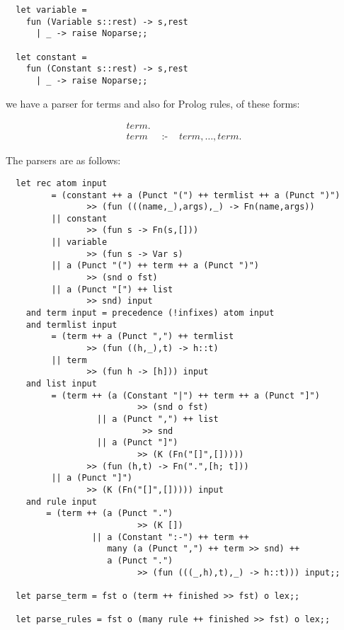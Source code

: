 \begin{boxed}\begin{verbatim}
  let variable =
    fun (Variable s::rest) -> s,rest
      | _ -> raise Noparse;;

  let constant =
    fun (Constant s::rest) -> s,rest
      | _ -> raise Noparse;;
\end{verbatim}\end{boxed}

\noindent we have a parser for terms and also for Prolog rules, of these forms:

\begin{eqnarray*}
term\mbox{.}    & &                                             \\
term            & \mbox{ :- } & term,\ldots,term\mbox{.}
\end{eqnarray*}

\noindent The parsers are as follows:

\begin{boxed}\begin{verbatim}
  let rec atom input
         = (constant ++ a (Punct "(") ++ termlist ++ a (Punct ")")
                >> (fun (((name,_),args),_) -> Fn(name,args))
         || constant
                >> (fun s -> Fn(s,[]))
         || variable
                >> (fun s -> Var s)
         || a (Punct "(") ++ term ++ a (Punct ")")
                >> (snd o fst)
         || a (Punct "[") ++ list
                >> snd) input
    and term input = precedence (!infixes) atom input
    and termlist input
         = (term ++ a (Punct ",") ++ termlist
                >> (fun ((h,_),t) -> h::t)
         || term
                >> (fun h -> [h])) input
    and list input
         = (term ++ (a (Constant "|") ++ term ++ a (Punct "]")
                          >> (snd o fst)
                  || a (Punct ",") ++ list
                           >> snd
                  || a (Punct "]")
                          >> (K (Fn("[]",[]))))
                >> (fun (h,t) -> Fn(".",[h; t]))
         || a (Punct "]")
                >> (K (Fn("[]",[])))) input
    and rule input
        = (term ++ (a (Punct ".")
                          >> (K [])
                 || a (Constant ":-") ++ term ++
                    many (a (Punct ",") ++ term >> snd) ++
                    a (Punct ".")
                          >> (fun (((_,h),t),_) -> h::t))) input;;

  let parse_term = fst o (term ++ finished >> fst) o lex;;

  let parse_rules = fst o (many rule ++ finished >> fst) o lex;;
\end{verbatim}\end{boxed}

